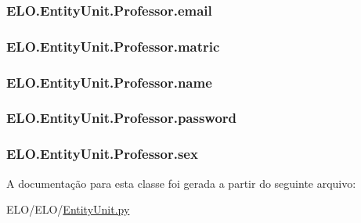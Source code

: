 \hypertarget{classELO_1_1EntityUnit_1_1Professor_a7c6f76f185515050334dc74a030043a7}{
\subsubsection[{email}]{\setlength{\rightskip}{0pt plus 5cm}E\-L\-O.\-Entity\-Unit.\-Professor.\-email}}\label{classELO_1_1EntityUnit_1_1Professor_a7c6f76f185515050334dc74a030043a7}
\hypertarget{classELO_1_1EntityUnit_1_1Professor_afc64d3f1b0e7c88530c7ee62f67ef671}{
\subsubsection[{matric}]{\setlength{\rightskip}{0pt plus 5cm}E\-L\-O.\-Entity\-Unit.\-Professor.\-matric}}\label{classELO_1_1EntityUnit_1_1Professor_afc64d3f1b0e7c88530c7ee62f67ef671}
\hypertarget{classELO_1_1EntityUnit_1_1Professor_ae85cc0fc9c64a277111a85e87efbe049}{
\subsubsection[{name}]{\setlength{\rightskip}{0pt plus 5cm}E\-L\-O.\-Entity\-Unit.\-Professor.\-name}}\label{classELO_1_1EntityUnit_1_1Professor_ae85cc0fc9c64a277111a85e87efbe049}
\hypertarget{classELO_1_1EntityUnit_1_1Professor_af0810854479e9f9a806eb6bfe7468e60}{
\subsubsection[{password}]{\setlength{\rightskip}{0pt plus 5cm}E\-L\-O.\-Entity\-Unit.\-Professor.\-password}}\label{classELO_1_1EntityUnit_1_1Professor_af0810854479e9f9a806eb6bfe7468e60}
\hypertarget{classELO_1_1EntityUnit_1_1Professor_ac049dc360c4af27037158e33577288e1}{
\subsubsection[{sex}]{\setlength{\rightskip}{0pt plus 5cm}E\-L\-O.\-Entity\-Unit.\-Professor.\-sex}}\label{classELO_1_1EntityUnit_1_1Professor_ac049dc360c4af27037158e33577288e1}


A documentação para esta classe foi gerada a partir do seguinte arquivo\-:\begin{DoxyCompactItemize}
\item 
E\-L\-O/\-E\-L\-O/\hyperlink{EntityUnit_8py}{Entity\-Unit.\-py}\end{DoxyCompactItemize}
